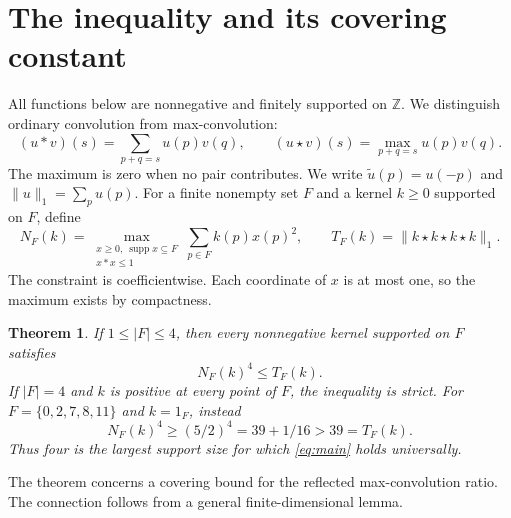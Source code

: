 \documentclass[11pt]{article}
\newtheorem{theorem}{Theorem}[section]
\theoremstyle{remark}
\numberwithin{equation}{section}
\begin{document}
\tableofcontents

\section{The inequality and its covering constant}
All functions below are nonnegative and finitely supported on $\mathbb Z$.
We distinguish ordinary convolution from max-convolution:
\[
 (u*v)(s)=\sum_{p+q=s}u(p)v(q),\qquad
 (u\star v)(s)=\max_{p+q=s}u(p)v(q).
\]
The maximum is zero when no pair contributes. We write
$\widetilde u(p)=u(-p)$ and $\|u\|_1=\sum_pu(p)$.
For a finite nonempty set $F$ and a kernel $k\ge0$ supported on $F$, define
\begin{equation}\label{eq:definitions}
 N_F(k)=\max_{\substack{x\ge0,\ \operatorname{supp}x\subseteq F\\x*x\le1}}
             \sum_{p\in F}k(p)x(p)^2,
 \qquad T_F(k)=\|k\star k\star k\star k\|_1.
\end{equation}
The constraint is coefficientwise. Each coordinate of $x$ is at most one,
so the maximum exists by compactness.

\begin{theorem}\label{thm:main}
If $1\le |F|\le4$, then every nonnegative kernel supported on $F$ satisfies
\begin{equation}\label{eq:main}
 N_F(k)^4\le T_F(k).
\end{equation}
If $|F|=4$ and $k$ is positive at every point of $F$, the inequality is strict.
For $F=\{0,2,7,8,11\}$ and $k=1_F$, instead
\[
 N_F(k)^4\ge(5/2)^4=39+1/16>39=T_F(k).
\]
Thus four is the largest support size for which \eqref{eq:main} holds
universally.
\end{theorem}

The theorem concerns a covering bound for the reflected max-convolution
ratio. The connection follows from a general finite-dimensional lemma.
\end{document}
